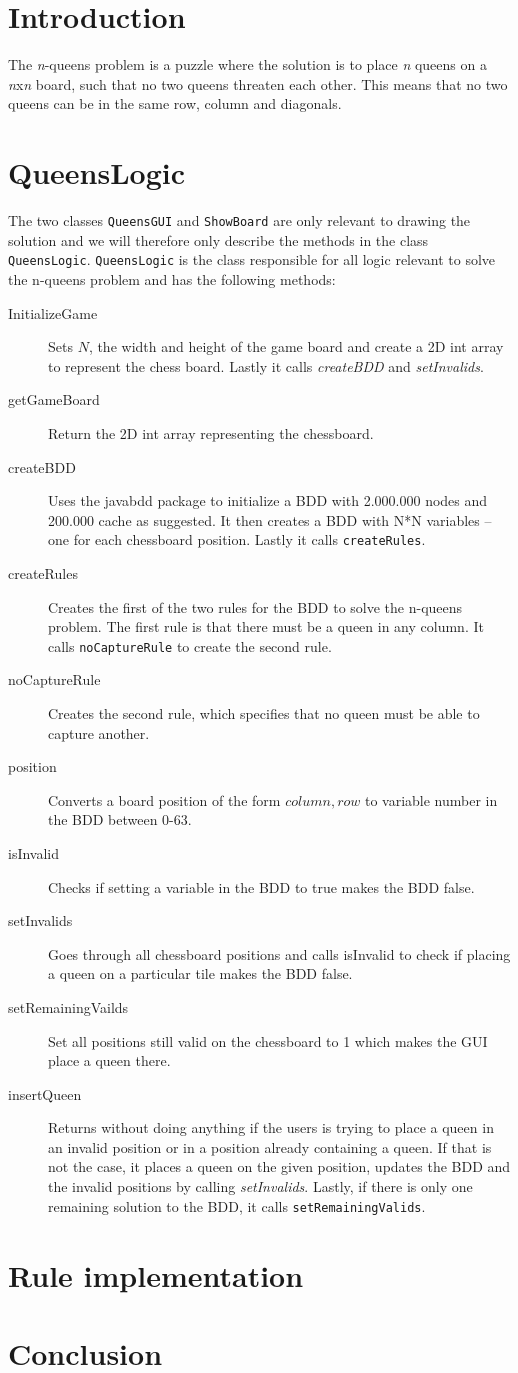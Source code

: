 \section{Introduction}
The \textit{n}-queens problem is a puzzle where the solution is to place \textit{n} queens on a \textit{n}x\textit{n} board, such that no two queens threaten each other. This means that no two queens can be in the same row, column and diagonals.
\section{QueensLogic}
The two classes \texttt{QueensGUI} and \texttt{ShowBoard} are only relevant to drawing the solution and we will therefore only describe the methods in the class \texttt{QueensLogic}. \texttt{QueensLogic} is the class responsible for all logic relevant to solve the n-queens problem and has the following methods:
\begin{description}
	\item[InitializeGame] Sets $N$, the width and height of the game board and create a 2D int array to represent the chess board. Lastly it calls \textit{createBDD} and \textit{setInvalids}.
	\item[getGameBoard] Return the 2D int array representing the chessboard.
	\item[createBDD] Uses the javabdd package to initialize a BDD with 2.000.000 nodes and 200.000 cache as suggested. It then creates a BDD with N*N variables -- one for each chessboard position. Lastly it calls \texttt{createRules}.
	\item[createRules] Creates the first of the two rules for the BDD to solve the n-queens problem. The first rule is that there must be a queen in any column. It calls \texttt{noCaptureRule} to create the second rule.
	\item[noCaptureRule] Creates the second rule, which specifies that no queen must be able to capture another.
	\item[position] Converts a board position of the form $column, row$ to variable number in the BDD between 0-63.	
	\item[isInvalid] Checks if setting a variable in the BDD to true makes the BDD false. 
	\item[setInvalids] Goes through all chessboard positions and calls isInvalid to check if placing a queen on a particular tile makes the BDD false.
	\item[setRemainingVailds] Set all positions still valid on the chessboard to 1 which makes the GUI place a queen there.
	\item[insertQueen] Returns without doing anything if the users is trying to place a queen in an invalid position or in a position already containing a queen. If that is not the case, it places a queen on the given position, updates the BDD and the invalid positions by calling \textit{setInvalids}. Lastly, if there is only one remaining solution to the BDD, it calls \texttt{setRemainingValids}.
\end{description}

\section{Rule implementation}

\section{Conclusion}